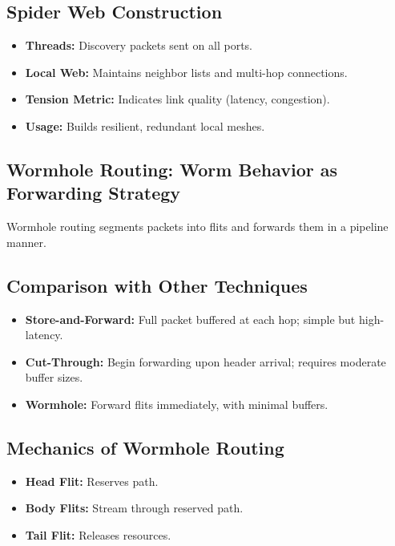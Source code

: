 \documentclass[../OAE-SPEC-MAIN.tex]{subfiles}
\begin{document}
\subsection{Spider Web Construction}

\begin{itemize}
\item \textbf{Threads:} Discovery packets sent on all ports.
\item \textbf{Local Web:} Maintains neighbor lists and multi-hop connections.
\item \textbf{Tension Metric:} Indicates link quality (latency, congestion).
\item \textbf{Usage:} Builds resilient, redundant local meshes.
\end{itemize}

\subsection{Wormhole Routing: Worm Behavior as Forwarding Strategy}

Wormhole routing segments packets into flits and forwards them in a pipeline manner.

\subsection{Comparison with Other Techniques}

\begin{itemize}
\item \textbf{Store-and-Forward:} Full packet buffered at each hop; simple but high-latency.
\item \textbf{Cut-Through:} Begin forwarding upon header arrival; requires moderate buffer sizes.
\item \textbf{Wormhole:} Forward flits immediately, with minimal buffers.
\end{itemize}

\subsection{Mechanics of Wormhole Routing}

\begin{itemize}
\item \textbf{Head Flit:} Reserves path.
\item \textbf{Body Flits:} Stream through reserved path.
\item \textbf{Tail Flit:} Releases resources.
\end{itemize}
\end{document}
